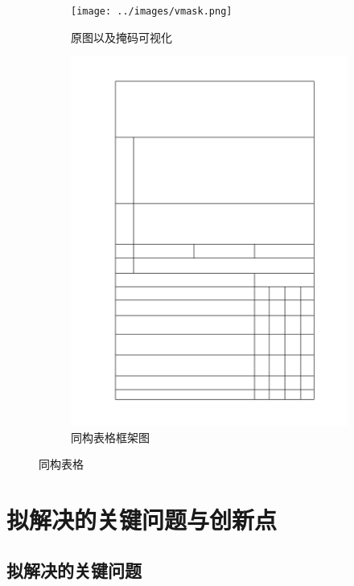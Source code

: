 \documentclass[UTF8,12pt, AutoFakeBold,fontset = founder]{ctexart}
\begin{document}
\begin{figure}[H]
    \centering
    \begin{subfigure}[b]{0.45\textwidth}
        \texttt{[image: ../images/vmask.png]}
        \caption{原图以及掩码可视化}
    \end{subfigure}
    \hfill
    \begin{subfigure}[b]{0.45\textwidth}
        \includegraphics[width=\textwidth]{../images/local-re.jpg}
        \caption{同构表格框架图}
    \end{subfigure}
    \caption{同构表格}
    \label{fig:local-re}
\end{figure}

\section{拟解决的关键问题与创新点}
\subsection{拟解决的关键问题}
\end{document}
